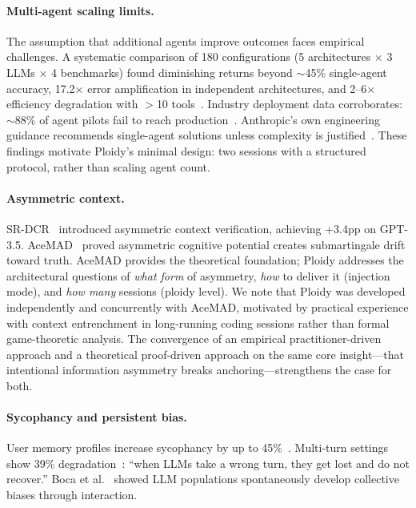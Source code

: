 \documentclass{article}
\begin{document}
\paragraph{Multi-agent scaling limits.} The assumption that additional agents improve outcomes faces empirical challenges. A systematic comparison of 180 configurations (5 architectures $\times$ 3 LLMs $\times$ 4 benchmarks) found diminishing returns beyond $\sim$45\% single-agent accuracy, 17.2$\times$ error amplification in independent architectures, and 2--6$\times$ efficiency degradation with $>$10 tools~\citep{kapoor2025scaling}. Industry deployment data corroborates: $\sim$88\% of agent pilots fail to reach production~\citep{composio2026pilots}. Anthropic's own engineering guidance recommends single-agent solutions unless complexity is justified~\citep{anthropic2024agents}. These findings motivate Ploidy's minimal design: two sessions with a structured protocol, rather than scaling agent count.

\paragraph{Asymmetric context.} SR-DCR~\citep{srdcr2025} introduced asymmetric context verification, achieving +3.4pp on GPT-3.5. AceMAD~\citep{liu2026acemad} proved asymmetric cognitive potential creates submartingale drift toward truth. AceMAD provides the theoretical foundation; Ploidy addresses the architectural questions of \emph{what form} of asymmetry, \emph{how} to deliver it (injection mode), and \emph{how many} sessions (ploidy level). We note that Ploidy was developed independently and concurrently with AceMAD, motivated by practical experience with context entrenchment in long-running coding sessions rather than formal game-theoretic analysis. The convergence of an empirical practitioner-driven approach and a theoretical proof-driven approach on the same core insight---that intentional information asymmetry breaks anchoring---strengthens the case for both.

\paragraph{Sycophancy and persistent bias.} User memory profiles increase sycophancy by up to 45\%~\citep{jain2025sycophancy}. Multi-turn settings show 39\% degradation~\citep{laban2025lost}: ``when LLMs take a wrong turn, they get lost and do not recover.'' Boca et al.~\citep{boca2025emergent} showed LLM populations spontaneously develop collective biases through interaction.
\end{document}
